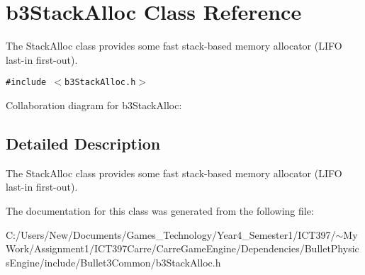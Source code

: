 \hypertarget{classb3_stack_alloc}{
\section{b3StackAlloc Class Reference}
\label{classb3_stack_alloc}
}
The StackAlloc class provides some fast stack-based memory allocator (LIFO last-in first-out).  


{\tt \#include $<$b3StackAlloc.h$>$}

Collaboration diagram for b3StackAlloc:

\subsection{Detailed Description}
The StackAlloc class provides some fast stack-based memory allocator (LIFO last-in first-out). 

The documentation for this class was generated from the following file:\begin{CompactItemize}
\item 
C:/Users/New/Documents/Games\_\-Technology/Year4\_\-Semester1/ICT397/$\sim$My Work/Assignment1/ICT397Carre/CarreGameEngine/Dependencies/BulletPhysicsEngine/include/Bullet3Common/b3StackAlloc.h\end{CompactItemize}
